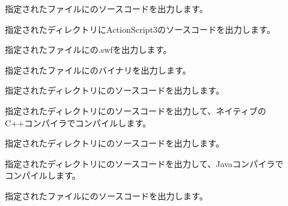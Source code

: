 \begin{description}
	\item[] 指定されたファイルにのソースコードを出力します。
	\item[] 指定されたディレクトリにActionScript3のソースコードを出力します。
	\item[] 指定されたファイルにの.swfを出力します。
	\item[] 指定されたファイルにのバイナリを出力します。
	\item[] 指定されたディレクトリにのソースコードを出力します。
	\item[] 指定されたディレクトリにのソースコードを出力して、ネイティブのC++コンパイラでコンパイルします。
	\item[] 指定されたディレクトリにのソースコードを出力します。
	\item[] 指定されたディレクトリにのソースコードを出力して、Javaコンパイラでコンパイルします。
	\item[] 指定されたファイルにのソースコードを出力します。
\end{description}
